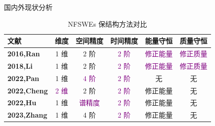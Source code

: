 \documentclass[aspectratio=169]{beamer}
\numberwithin{theorem}{section} %
\numberwithin{equation}{section}%
\numberwithin{figure}{section}%
\numberwithin{table}{section}%
\begin{document}
		\begin{frame}{国内外现状分析}
			\begin{table}[htbp]
				\centering
				\small
				\caption{NFSWEs 保结构方法对比}
					\begin{tabular}{lccccc}
					\toprule
					\textcolor[rgb]{0.227,0.373,0.306}{\textbf{文献}} & \textcolor[rgb]{0.227,0.373,0.306}{\textbf{维度}} & \textcolor[rgb]{0.227,0.373,0.306}{\textbf{空间精度}} & \textcolor[rgb]{0.227,0.373,0.306}{\textbf{时间精度}} & \textcolor[rgb]{0.227,0.373,0.306}{\textbf{能量守恒}} & \textcolor[rgb]{0.227,0.373,0.306}{\textbf{质量守恒}} \\
					\midrule
					\textcolor[rgb]{0.227,0.373,0.306}{\textbf{\cite{ranLinearlyImplicitConservative2016}{2016,Ran}}} & 1 维   & 2 阶   & \textcolor{purple}{2 阶}   & \textcolor{purple}{修正能量}  & \textcolor{purple}{修正质量} \\
					\midrule
					\textcolor[rgb]{0.227,0.373,0.306}{\textbf{\cite{liFastEnergyConserving2018}{2018,Li}}} & 1 维   & 2 阶   & \textcolor{purple}{2 阶}   & \textcolor{purple}{修正能量}  & \textcolor{purple}{修正质量} \\
					\midrule
					\textcolor[rgb]{0.227,0.373,0.306}{\textbf{\cite{panFourthorderDifferenceScheme2022}{2022,Pan}}} & 1 维   & \textcolor{purple}{4 阶}   & \textcolor{purple}{2 阶}   & 无     & 无 \\
					\midrule
					\textcolor[rgb]{0.227,0.373,0.306}{\textbf{\cite{chengConvergenceEnergyconservingScheme2022}{2022,Cheng}}} & \textcolor{purple}{2 维}   & 2 阶   & \textcolor{purple}{2 阶}   & 修正能量  & 无 \\
					\midrule
					\textcolor[rgb]{0.227,0.373,0.306}{\textbf{\cite{huEfficientEnergyPreserving2022}{2022,Hu}}} & 1 维   & \textcolor{purple}{谱精度}   & \textcolor{purple}{2 阶}   & 修正能量  & 无 \\
					\midrule
					\textcolor[rgb]{0.227,0.373,0.306}{\textbf{\cite{zhangHighorderStructurepreservingDifference2023}{2023,Zhang}}} & 1 维   & 4 阶   & \textcolor{purple}{2 阶}   & 修正能量  & 无 \\
					\bottomrule
					\end{tabular}%
				\label{tab:2}%
				\end{table}%
				\end{frame}
	
\end{document}
